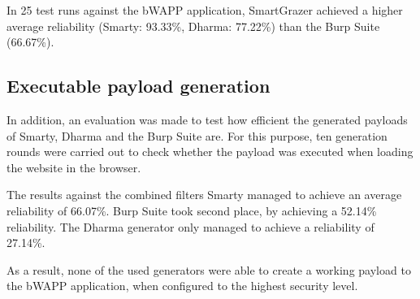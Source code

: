 In 25 test runs against the bWAPP application, SmartGrazer achieved a higher average
reliability (Smarty: 93.33\%, Dharma: 77.22\%) than the Burp Suite (66.67\%).

\subsection*{Executable payload generation}

In addition, an evaluation was made to test how efficient the generated payloads of Smarty, Dharma and the Burp Suite are. For this purpose, ten generation rounds were carried out to check whether the payload was executed when loading the website in the browser.

The results against the combined filters Smarty managed to achieve an average reliability of 66.07\%. Burp Suite took second place, by achieving a 52.14\% reliability. The Dharma generator only managed to achieve a reliability of 27.14\%.

As a result, none of the used generators were able to create a working payload to the
bWAPP application, when configured to the highest security level.